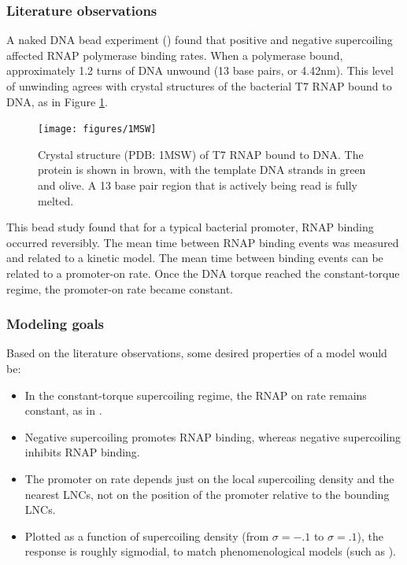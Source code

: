 \documentclass[11pt]{article}
\begin{document}
\subsubsection{Literature observations}
A naked DNA bead experiment (\textcite{revyakinPromoterUnwindingPromoter2004}) found that positive and negative supercoiling affected RNAP polymerase binding rates. When a polymerase bound, approximately 1.2 turns of DNA unwound (13 base pairs, or 4.42nm). This level of unwinding agrees with crystal structures of the bacterial T7 RNAP bound to DNA, as in Figure \ref{fig:rnap_bound}.

\begin{figure}[h]
    \centering
    \texttt{[image: figures/1MSW]}
    \caption{Crystal structure (PDB: 1MSW) of T7 RNAP bound to DNA. The protein is shown in brown, with the template DNA strands in green and olive.
             A 13 base pair region that is actively being read is fully melted.}
    \label{fig:rnap_bound}
\end{figure}

This bead study found that for a typical bacterial promoter, RNAP binding occurred reversibly. The mean time between RNAP binding events was measured and related to a kinetic model. The mean time between binding events can be related to a promoter-on rate. Once the DNA torque reached the constant-torque regime, the promoter-on rate became constant.

\subsubsection{Modeling goals}
Based on the literature observations, some desired properties of a model would be:
\begin{itemize}
    \item In the constant-torque supercoiling regime, the RNAP on rate remains constant, as in \textcite{revyakinPromoterUnwindingPromoter2004}.
    \item Negative supercoiling promotes RNAP binding, whereas negative supercoiling inhibits RNAP binding.
    \item The promoter on rate depends just on the local supercoiling density and the nearest LNCs, not on the position of the promoter relative to the bounding LNCs.
    \item Plotted as a function of supercoiling density (from \(\sigma = -.1\) to \(\sigma = .1\)), the response is roughly sigmodial, to match phenomenological models (such as \textcite{elhoudaiguiBacterialGenomeArchitecture2019a}).
\end{itemize}
\end{document}

